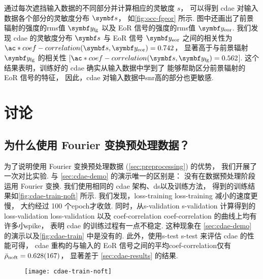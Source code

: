 通过每次遮挡输入数据的不同部分并计算相应的灵敏度 $s$，
可以得到 \ac{cdae} 对输入数据各个部分的灵敏度分布 $\B{s}$，
如\autoref{fig:occ-fgeor} 所示.
图中还画出了前景辐射的强度的\acs*{rms}值 $\B{y}_{\R{fg}}$
以及 EoR 信号的强度的\acs*{rms}值 $\B{y}_{\R{eor}}$.
我们发现 \ac{cdae} 的灵敏度分布 $\B{s}$ 与 EoR 信号 $\B{y}_{\R{eor}}$
之间的相关性为 $\ac*{coef-correlation}(\B{s}, \B{y}_{\R{eor}}) = 0.742$，
显著高于与前景辐射 $\B{y}_{\R{fg}}$ 的相关性
[$\ac*{coef-correlation}(\B{s}, \B{y}_{\R{fg}}) = 0.562$].
这个结果表明，训练好的 \ac{cdae} 确实从输入数据中学到了
能够帮助区分前景辐射的 EoR 信号的特征，
因此，\ac{cdae} 对输入数据中\ac{snr}高的部分也更敏感.


\section{讨论}

\subsection{为什么使用 Fourier 变换预处理数据？}
\label{sec:why-ft}

为了说明使用 Fourier 变换预处理数据 (\autoref{sec:preprocessing}) 的优势，
我们开展了一次对比实验.
与 \autoref{sec:cdae-demo} 的演示唯一的区别是：
没有在数据预处理阶段运用 Fourier 变换.
我们使用相同的 \ac{cdae} 架构、\ac{ds}以及训练方法，
得到的训练结果如\autoref{fig:cdae-train-noft} 所示.
我们发现，\acl{loss-training} \ac{loss-training} 减小的速度更慢，
大约经过 100 个\ac{epoch}才收敛.
同时，从\acl{s-validation} \ac{s-validation}
计算得到的\acl{loss-validation} \ac{loss-validation} 以及
\acl{coef-correlation} \ac{coef-correlation}
的曲线上均有许多小\ac{spike}，
表明 \ac{cdae} 的训练过程有一点不稳定.
这种现象在 \autoref{sec:cdae-demo} 的演示以及\autoref{fig:cdae-train}
中是没有的.
此外，使用\acl{s-test} \ac{s-test} 来评估 \ac{cdae} 的性能可得，
\ac{cdae} 重构的与输入的 EoR 信号之间的平均\acl{coef-correlation}仅有
$\bar{\rho}_{\mathrm{noft}} = \num{0.628 +- 0.167}$，
显著差于 \autoref{sec:cdae-results} 的结果.

\begin{figure}[htp]
  \centering
  \texttt{[image: cdae-train-noft]}
  \label{fig:cdae-train-noft}
\end{figure}


